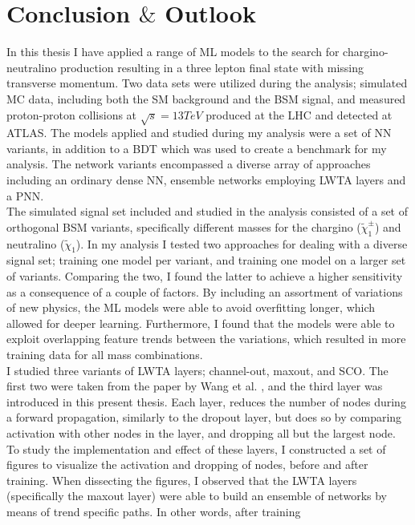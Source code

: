 \newpage
\chapter*{Conclusion $\&$ Outlook}
In this thesis I have applied a range of \ac{ML} models to the search for chargino-neutralino production resulting in 
a three lepton final state with missing transverse momentum. Two data sets were utilized during the analysis; simulated \ac{MC} data, including 
both the \ac{SM} background and the \ac{BSM} signal, and  measured proton-proton collisions at $\sqrt{s} = 13TeV$ produced at the \ac{LHC} and detected 
at \ac{ATLAS}. The models applied and studied during my analysis were a set of \ac{NN} variants, in addition to a \ac{BDT} which was used to 
create a benchmark for my analysis. The network variants encompassed a diverse array of approaches including an ordinary dense \ac{NN}, ensemble networks employing 
\ac{LWTA} layers and a \ac{PNN}.
\\
The simulated signal set included and studied in the analysis consisted of a set of orthogonal \ac{BSM} variants, specifically different masses for the chargino ($\tilde{\chi}^\pm_1$) 
and neutralino ($\tilde{\chi}_1$). In my analysis I tested two approaches for dealing with a diverse signal set; training one model per variant, and training one model on a larger set 
of variants. Comparing the two, I found the latter to achieve a higher sensitivity as a consequence of a couple of factors. By including an assortment of variations of new physics, 
the \ac{ML} models were able to avoid overfitting longer, which allowed for deeper learning. Furthermore, I found that the models were able to exploit overlapping feature trends between 
the variations, which resulted in more training data for all mass combinations.  
\\
I studied three variants of \ac{LWTA} layers; channel-out, maxout, and \ac{SCO}. The first two were taken from the paper by Wang et al. \cite{wang_maxout_2013}, and the third layer was introduced
in this present thesis. Each layer, reduces the number of nodes during a forward propagation, similarly to the dropout layer, but does so by comparing activation with other nodes in the layer, and 
dropping all but the largest node. To study the implementation and effect of these layers, I constructed a set of figures to visualize the activation and dropping of nodes, before and after training. 
When dissecting the figures, I observed that the \ac{LWTA} layers (specifically the maxout layer) were able to build an ensemble of networks by means of trend specific paths. In other words, after training 
